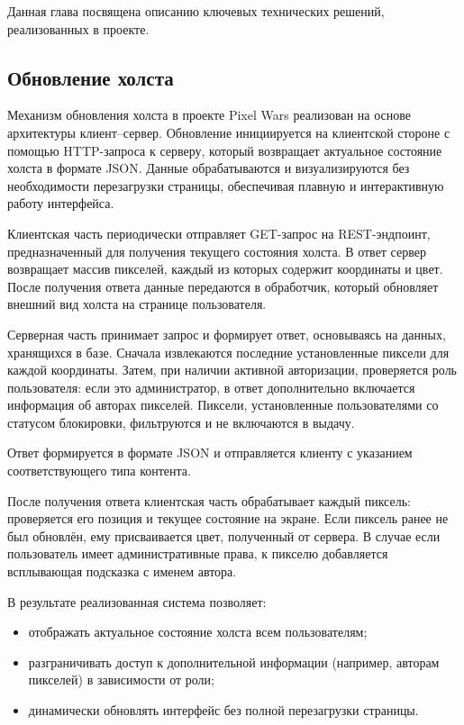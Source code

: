 \newpage


Данная глава посвящена описанию ключевых технических решений, реализованных в проекте.

\subsection{Обновление холста}

Механизм обновления холста в проекте Pixel Wars реализован на основе архитектуры клиент–сервер. Обновление инициируется на клиентской стороне с помощью HTTP-запроса к серверу, который возвращает актуальное состояние холста в формате JSON. Данные обрабатываются и визуализируются без необходимости перезагрузки страницы, обеспечивая плавную и интерактивную работу интерфейса.

Клиентская часть периодически отправляет GET-запрос на REST-эндпоинт, предназначенный для получения текущего состояния холста. В ответ сервер возвращает массив пикселей, каждый из которых содержит координаты и цвет. После получения ответа данные передаются в обработчик, который обновляет внешний вид холста на странице пользователя.

Серверная часть принимает запрос и формирует ответ, основываясь на данных, хранящихся в базе. Сначала извлекаются последние установленные пиксели для каждой координаты. Затем, при наличии активной авторизации, проверяется роль пользователя: если это администратор, в ответ дополнительно включается информация об авторах пикселей. Пиксели, установленные пользователями со статусом блокировки, фильтруются и не включаются в выдачу.

Ответ формируется в формате JSON и отправляется клиенту с указанием соответствующего типа контента.

После получения ответа клиентская часть обрабатывает каждый пиксель: проверяется его позиция и текущее состояние на экране. Если пиксель ранее не был обновлён, ему присваивается цвет, полученный от сервера. В случае если пользователь имеет административные права, к пикселю добавляется всплывающая подсказка с именем автора.

В результате реализованная система позволяет:
\begin{itemize}
    \item отображать актуальное состояние холста всем пользователям;
    \item разграничивать доступ к дополнительной информации (например, авторам пикселей) в зависимости от роли;
    \item динамически обновлять интерфейс без полной перезагрузки страницы.
\end{itemize}

